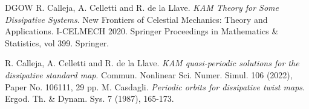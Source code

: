 \documentclass{amsart}
\begin{document}
\begin{thebibliography}{DGOW}
			 R. Calleja, A. Celletti and R. de la Llave. {\it KAM Theory for Some Dissipative Systems}. New Frontiers of Celestial Mechanics: Theory and Applications. I-CELMECH 2020. Springer Proceedings in Mathematics \& Statistics, vol 399. Springer.
			
			
			 R. Calleja, A. Celletti and R. de la Llave. {\it KAM quasi-periodic solutions for the dissipative standard map}. Commun. Nonlinear Sci. Numer. Simul. 106 (2022), Paper No. 106111, 29 pp.
			 M. Casdagli. {\it Periodic orbits for dissipative twist maps}. Ergod. Th. \& Dynam. Sys. {7} (1987), 165-173.
			
			
			
			
			
			
			
			
			

\end{thebibliography}
\end{document}
